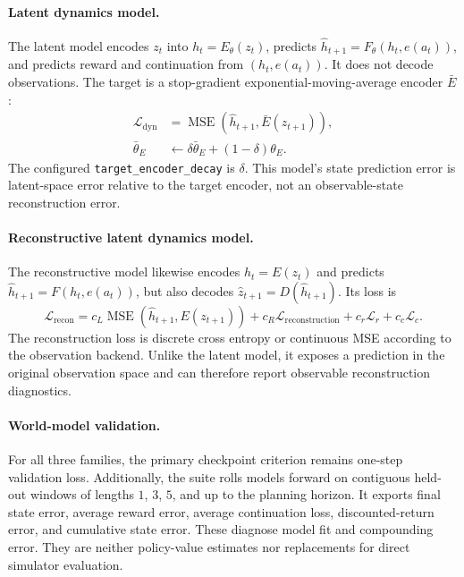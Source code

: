 \documentclass[10pt,twocolumn]{article}
\newcommand{\code}[1]{\texttt{#1}}
\begin{document}
\paragraph{Latent dynamics model.}
The latent model encodes $z_t$ into $h_t=E_\theta(z_t)$, predicts $\hat h_{t+1}=F_\theta(h_t,e(a_t))$, and predicts reward and continuation from $(h_t,e(a_t))$. It does not decode observations. The target is a stop-gradient exponential-moving-average encoder $\bar E$:
\begin{align}
 \mathcal{L}_{\mathrm{dyn}} &= \operatorname{MSE}(\hat h_{t+1},\bar E(z_{t+1})),\\
 \bar\theta_E &\leftarrow \delta\bar\theta_E+(1-\delta)\theta_E.
\end{align}
The configured \code{target\_encoder\_decay} is $\delta$. This model's state prediction error is latent-space error relative to the target encoder, not an observable-state reconstruction error.

\paragraph{Reconstructive latent dynamics model.}
The reconstructive model likewise encodes $h_t=E(z_t)$ and predicts $\hat h_{t+1}=F(h_t,e(a_t))$, but also decodes $\hat z_{t+1}=D(\hat h_{t+1})$. Its loss is
\begin{equation}
 \mathcal{L}_{\mathrm{recon}} = c_L\operatorname{MSE}(\hat h_{t+1},E(z_{t+1}))
 + c_R\mathcal{L}_{\mathrm{reconstruction}} + c_r\mathcal{L}_r + c_c\mathcal{L}_c.
\end{equation}
The reconstruction loss is discrete cross entropy or continuous MSE according to the observation backend. Unlike the latent model, it exposes a prediction in the original observation space and can therefore report observable reconstruction diagnostics.

\paragraph{World-model validation.}
For all three families, the primary checkpoint criterion remains one-step validation loss. Additionally, the suite rolls models forward on contiguous held-out windows of lengths $1$, $3$, $5$, and up to the planning horizon. It exports final state error, average reward error, average continuation loss, discounted-return error, and cumulative state error. These diagnose model fit and compounding error. They are neither policy-value estimates nor replacements for direct simulator evaluation.
\end{document}
